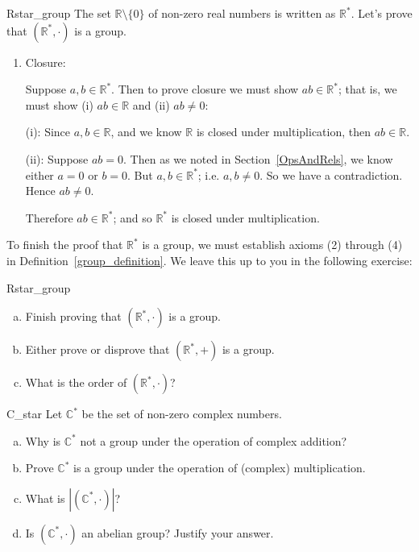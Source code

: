 \begin{example}{Rstar_group}
The set ${\mathbb R} \setminus \{0 \}$ of non-zero real numbers is written as ${\mathbb R}^{\ast}$.  Let's prove that $({\mathbb R}^{\ast}, \cdot)$ is a group.
\begin{enumerate}[(1)]
\item
Closure:  

\noindent
Suppose $a, b \in {\mathbb R}^{\ast}$.  Then to prove closure we must show $ab \in {\mathbb R}^{\ast}$; that is, we must show (i)
$ab \in {\mathbb R}$ and (ii) $ab \neq 0$:

\medskip{}
\noindent
(i):  Since $a, b \in {\mathbb R}$, and we know ${\mathbb R}$ is closed under multiplication, then $ab \in {\mathbb R}$.

\medskip{}
\noindent
(ii):  Suppose $ab = 0$.  Then as we  noted in Section~\ref{OpsAndRels}, we know either $a = 0$ or $b = 0$.  But $a, b \in {\mathbb R}^{\ast}$; i.e. $a, b \neq 0$.  So we have a contradiction.  Hence $ab \neq 0$.

\medskip{}
\noindent
Therefore $ab \in {\mathbb R}^{\ast}$; and so ${\mathbb R}^{\ast}$  is closed under multiplication.
\end{enumerate}
To finish the proof that ${\mathbb R}^{\ast}$ is a group, we must establish axioms (2) through (4) in Definition~\ref{group_definition}. We leave this up to you in the following exercise:

\begin{exercise}{Rstar_group} 
\begin{enumerate}[(a)]
\item
Finish proving that $({\mathbb R}^{\ast}, \cdot)$ is a group.
\item
Either prove or disprove that $({\mathbb R}^{\ast}, +)$ is a group.
\item
What is the order of $({\mathbb R}^{\ast}, \cdot)$?
\end{enumerate}
\end{exercise}
  \end{example}


\begin{exercise}{C_star}
Let ${\mathbb C}^{\ast} $\label{noteCstar} be the set of non-zero complex 
numbers. 
\begin{enumerate}[(a)]
\item
Why is ${\mathbb C}^{\ast}$ not a group under the operation of complex addition?
\item
Prove ${\mathbb C}^{\ast}$ is a group under the operation of (complex) multiplication.
\item
What is $| ({\mathbb C}^{\ast}, \cdot) |$?
\item
Is $({\mathbb C}^{\ast}, \cdot)$ an abelian group?  Justify your answer.
\end{enumerate}  
\end{exercise}

